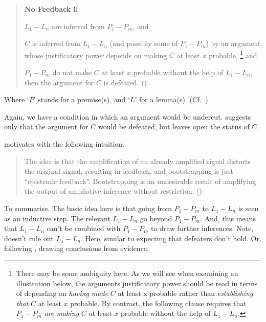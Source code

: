 \begin{note}[No feedback]
  \begin{quote}
    \textbf{No Feedback} If
    \begin{enumerate*}[label=(\roman*)]
    \item\label{W:NF:i} \(L_{1}-L_{n}\) are inferred from \(P_{1}-P_{m}\), and
    \item\label{W:NF:ii} \(C\) is inferred from \(L_{1}-L_{n}\) (and possibly some of \(P_{1}-P_{m}\)) by an argument whose justificatory power depends on making \(C\) at least \(x\) probable,\nolinebreak
      \footnote{
        There may be some ambiguity here.
        As we will see when examining an illustration below, the arguments justificatory power should be read in terms of depending on \emph{having made} \(C\) at least x probable rather than \emph{establishing that} \(C\) at least \(x\) probable.
        By contrast, the following clause requires that \(P_{1}-P_{m}\) \emph{are making} \(C\) at least \(x\) probable without the help of \(L_{1}-L_{n}\).
      }
      and
    \item\label{W:NF:iii} \(P_{1}-P_{m}\) do not make \(C\) at least \(x\) probable without the help of \(L_{1}-L_{n}\), then the argument for \(C\) is defeated.\linebreak
      \mbox{}\hfill\mbox{(\Citeyear[533--534]{Weisberg:2010to})}
    \end{enumerate*}
  \end{quote}
  Where `\(P\)' stands for a premise(s), and `\(L\)' for a lemma(s). (Cf.~\Citeyear[533]{Weisberg:2010to})

  Again, we have a condition in which an argument would be undercut.
  \wnf{} suggests only that the argument for \(C\) would be defeated, but leaves open the status of \(C\).
\end{note}

\begin{note}
  \citeauthor{Weisberg:2010to} motivates with the following intuition.
  \begin{quote}
    The idea is that the ampliﬁcation of an already ampliﬁed signal distorts the original signal, resulting in feedback, and bootstrapping is just ``epistemic feedback''.
    Bootstrapping is an undesirable result of amplifying the output of ampliative inference without restriction.\linebreak
    \mbox{}\hfill\mbox{(\Citeyear[534]{Weisberg:2010to})}
  \end{quote}

  To summarise.
  {
    \color{red}
    The basic idea here is that going from \(P_{1}-P_{m}\) to \(L_{1}-L_{n}\) is seen as an inductive step.
    The relevant \(L_{1}-L_{n}\) go beyond \(P_{1}-P_{m}\).
    And, this means that \(L_{1}-L_{n}\) can't be combined with \(P_{1}-P_{m}\) to draw further inferences.
  }
  {
    \color{red}
    Note, doesn't rule out \(L_{1}-L_{n}\).
    Here, similar to expecting that defeaters don't hold.
    Or, following \citeauthor{Weisberg:2010to}, drawing conclusions from evidence.
  }
\end{note}

